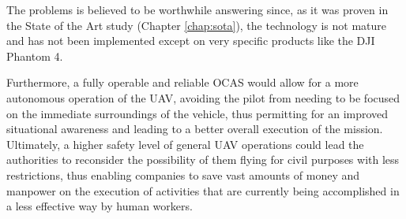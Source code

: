 The problems is believed to be worthwhile answering since, as it was proven in the State of the Art study (Chapter \ref{chap:sota}), the technology is not mature and has not been implemented except on very specific products like the DJI Phantom 4.

Furthermore, a fully operable and reliable OCAS would allow for a more autonomous operation of the UAV, avoiding the pilot from needing to be focused on the immediate surroundings of the vehicle, thus permitting for an improved situational awareness and leading to a better overall execution of the mission.
Ultimately, a higher safety level of general UAV operations could lead the authorities to reconsider the possibility of them flying for civil purposes with less restrictions, thus enabling companies to save vast amounts of money and manpower on the execution of activities that are currently being accomplished in a less effective way by human workers.



